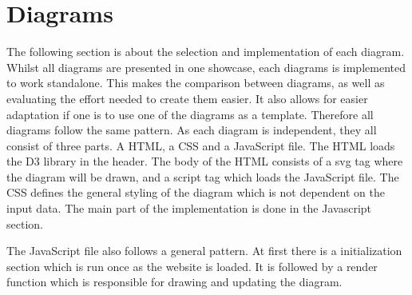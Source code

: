 



\section{Diagrams}

The following section is about the selection and implementation of each diagram. Whilst all diagrams are presented in one showcase, each diagrams is implemented to work standalone. This makes the comparison between diagrams, as well as evaluating the effort needed to create them easier. It also allows for easier adaptation if one is to use one of the diagrams as a template. Therefore all diagrams follow the same pattern. As each diagram is independent, they all consist of three parts. A HTML, a CSS and a JavaScript file. The HTML loads the D3 library in the header. The body of the HTML consists of a svg tag where the diagram will be drawn, and a script tag which loads the JavaScript file. The CSS defines the general styling of the diagram which is not dependent on the input data. The main part of the implementation is done in the Javascript section.

The JavaScript file also follows a general pattern. At first there is a initialization section which is run once as the website is loaded. It is followed by a render function which is responsible for drawing and updating the diagram. 

